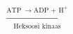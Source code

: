 \documentclass[preview]{standalone}
\begin{document}
\begin{align*}
\xrightarrow[\text{Heksoosi kinaas}]{\text{ATP}\: \rightarrow \text{ADP + H}^{+}}
\end{align*}
\end{document}
